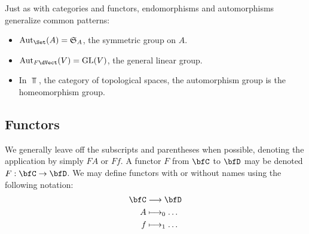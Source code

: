 \documentclass[a5paper]{article}
\begin{document}
\begin{example*}
  Just as with categories and functors, endomorphisms and automorphisms generalize
  common patterns:
  \begin{itemize}
    \itemsep-0.2em
    \item $\Aut_{\Set}(A)=\S_A$, the symmetric group on $A$.
    \item $\Aut_{F\dVect}(V)=\GL(V)$, the general linear group.
    \item In $\Top$, the category of topological spaces, the automorphism group
      is the homeomorphism group.
  \end{itemize}
\end{example*}

\subsection{Functors}
\label{subsec:functors}


We generally leave off the subscripts and parentheses when possible, denoting
the application by simply $FA$ or $Ff$. A functor $F$ from $\bfC$ to
$\bfD$ may be denoted $F:\bfC\to\bfD$. We may define functors with or without names
using the following notation:
\begin{align*}
  \bfC &\longrightarrow \bfD \\
  A    &\longmapsto_0 \ldots \\
  f    &\longmapsto_1 \ldots
\end{align*}
\end{document}
